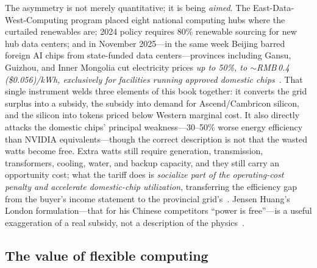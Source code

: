 The asymmetry is not merely quantitative; it is being \emph{aimed}. The East-Data-West-Computing program placed eight national computing hubs where the curtailed renewables are; 2024 policy requires 80\% renewable sourcing for new hub data centers; and in November 2025---in the same week Beijing barred foreign AI chips from state-funded data centers---provinces including Gansu, Guizhou, and Inner Mongolia cut electricity prices \emph{up to 50\%, to $\sim$RMB\,0.4 (\$0.056)/kWh, exclusively for facilities running approved domestic chips}~\cite{edwc,china-dc-power,datacenter-mandate}. That single instrument welds three elements of this book together: it converts the grid surplus into a subsidy, the subsidy into demand for Ascend/Cambricon silicon, and the silicon into tokens priced below Western marginal cost. It also directly attacks the domestic chips' principal weakness---30--50\% worse energy efficiency than NVIDIA equivalents---though the correct description is not that the wasted watts become free. Extra watts still require generation, transmission, transformers, cooling, water, and backup capacity, and they still carry an opportunity cost; what the tariff does is \emph{socialize part of the operating-cost penalty and accelerate domestic-chip utilization}, transferring the efficiency gap from the buyer's income statement to the provincial grid's~\cite{china-dc-power}. Jensen Huang's London formulation---that for his Chinese competitors ``power is free''---is a useful exaggeration of a real subsidy, not a description of the physics~\cite{huang-quotes}.

\subsection{The value of flexible computing}
\label{sec:flex}

